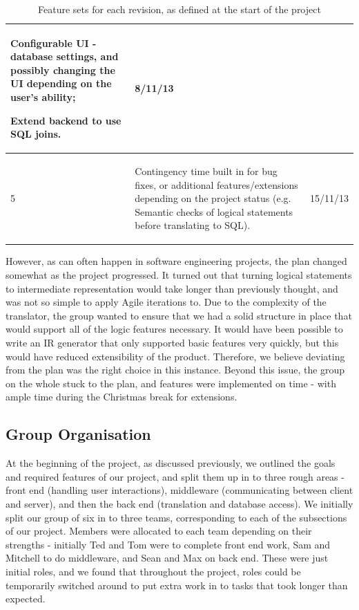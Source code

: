 \documentclass[a4paper, 11pt]{article}
\begin{document}
\begin{table}[H]
\begin{tabular}{| l | p{} | l |}
\begin{compactitem}
            \item Configurable UI - database settings, and possibly changing the
              UI depending on the user's ability;
            \item Extend backend to use SQL joins.
          \end{compactitem}
          & 8/11/13 \\
        \hline
        5 &
          \begin{compactitem}
            \item Contingency time built in for bug fixes, or additional
              features/extensions depending on the project status (e.g. Semantic
              checks of logical statements before translating to SQL).
          \end{compactitem}
          & 15/11/13 \\
        \hline
      \end{tabular}
      \caption{Feature sets for each revision, as defined at the start of the
        project}
    \end{table}

    However, as can often happen in software engineering projects, the plan
    changed somewhat as the project progressed. It turned out that turning
    logical statements to intermediate representation would take longer than
    previously thought, and was not so simple to apply Agile iterations to. Due
    to the complexity of the translator, the group wanted to ensure that we
    had a solid structure in place that would support all of the logic features
    necessary. It would have been possible to write an IR generator that only
    supported basic features very quickly, but this would have reduced
    extensibility of the product. Therefore, we believe deviating from the plan
    was the right choice in this instance. Beyond this issue, the group on the
    whole stuck to the plan, and features were implemented on time - with ample
    time during the Christmas break for extensions.

  \subsection{Group Organisation}
    At the beginning of the project, as discussed previously, we outlined the
    goals and required features of our project, and split them up in to three
    rough areas - front end (handling user interactions),
    middleware (communicating between client and server), and
    then the back end (translation and database access).
    We initially split our group of six in to three teams,
    corresponding to each of the subsections of our project. Members were
    allocated to each team depending on their strengths - initially Ted and Tom
    were to complete front end work, Sam and Mitchell to do middleware, and
    Sean and Max on back end. These were just initial roles, and we found that
    throughout the project, roles could be temporarily switched around to put
    extra work in to tasks that took longer than expected.
\end{document}
